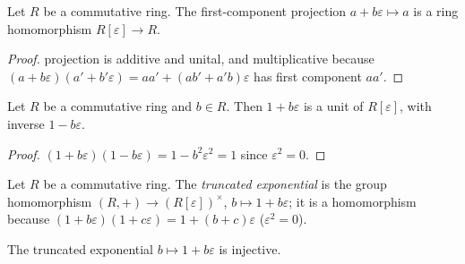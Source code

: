 \begin{lemma}\label{mk-lem:dual_number_fst_ring_hom}
  \leanok

  Let \(R\) be a commutative ring. The first-component projection
  \(a + b\varepsilon \mapsto a\) is a ring homomorphism
  \(R[\varepsilon] \to R\).
\end{lemma}

\begin{proof}
  \leanokThe projection is additive and unital, and multiplicative because
  \((a + b\varepsilon)(a' + b'\varepsilon)
  = aa' + (ab' + a'b)\varepsilon\) has first component \(aa'\).
\end{proof}

\begin{lemma}\label{mk-lem:dual_number_trunc_exp_unit}
  \leanok

  Let \(R\) be a commutative ring and \(b \in R\). Then
  \(1 + b\varepsilon\) is a unit of \(R[\varepsilon]\), with inverse
  \(1 - b\varepsilon\).
\end{lemma}

\begin{proof}
  \leanok\((1 + b\varepsilon)(1 - b\varepsilon) = 1 - b^2\varepsilon^2 = 1\)
  since \(\varepsilon^2 = 0\).
\end{proof}

\begin{definition}\label{mk-def:dual_number_trunc_exp}
  \leanok

  Let \(R\) be a commutative ring. The \emph{truncated exponential} is
  the group homomorphism
  \((R, +) \to (R[\varepsilon])^{\times}\), \(b \mapsto 1 + b\varepsilon\);
  it is a homomorphism because
  \((1 + b\varepsilon)(1 + c\varepsilon) = 1 + (b + c)\varepsilon\)
  (\(\varepsilon^2 = 0\)).
\end{definition}

\begin{lemma}\label{mk-lem:dual_number_trunc_exp_injective}
  \leanok

  The truncated exponential \(b \mapsto 1 + b\varepsilon\) is injective.
\end{lemma}

